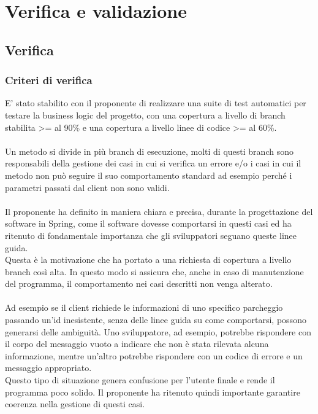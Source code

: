 
\chapter{Verifica e validazione}
\label{cap:verifica-e-validazione}

\section{Verifica}
\subsection{Criteri di verifica}
E' stato stabilito con il proponente di realizzare  
una suite di test automatici per testare la business logic del progetto,
con una copertura a livello di branch stabilita >= al 90\% e una copertura
a livello linee di codice >= al 60\%.
\\\\
Un metodo si divide in più branch di esecuzione, molti di questi branch sono 
responsabili della gestione dei casi in cui si verifica un errore
e/o i casi in cui il metodo non può seguire il suo comportamento
standard ad esempio perché i parametri passati dal client non sono validi.
\\\\
Il proponente ha definito in maniera chiara e precisa, durante la progettazione del software in 
Spring, come il software dovesse comportarsi in questi casi ed ha ritenuto di fondamentale importanza
che gli sviluppatori seguano queste linee guida.
\\
Questa è la motivazione che ha portato a una richiesta di copertura a livello branch così alta. In questo modo si assicura 
che, anche in caso di manutenzione del programma, il comportamento nei casi 
descritti non venga alterato.
\\\\
Ad esempio se il client richiede le informazioni di uno specifico parcheggio passando 
un'id inesistente, senza delle linee guida su come comportarsi, 
possono generarsi delle ambiguità. Uno sviluppatore, ad esempio, potrebbe rispondere con 
il corpo del messaggio vuoto a indicare che non è stata rilevata alcuna informazione, mentre 
un'altro potrebbe rispondere con un codice di errore e un messaggio appropriato. 
\\
Questo tipo di situazione genera confusione per l'utente finale e rende il programma poco 
solido. Il proponente ha ritenuto quindi importante garantire coerenza nella gestione di questi casi.

